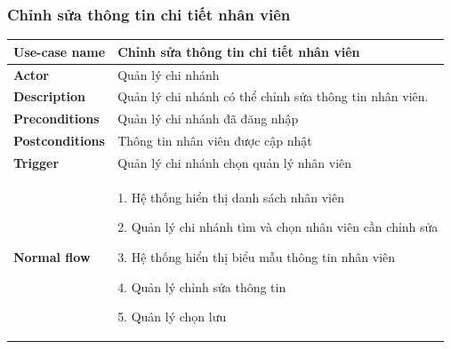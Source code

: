         \subsubsection{Chỉnh sửa thông tin chi tiết nhân viên}
        {
\setlength\extrarowheight{6pt}
            \begin{longtable}{| p{} | p{} |} 
                \hline
                    \textbf{Use-case name} 
                & 
                    Chỉnh sửa thông tin chi tiết nhân viên
                \\
                \hline
                    \textbf{Actor} 
                & 
                    Quản lý chi nhánh
                \\
                \hline
                    \textbf{Description} 
                & 
                    Quản lý chi nhánh có thể chỉnh sửa thông tin nhân viên.
                \\
                \hline
                    \textbf{Preconditions} 
                &
                    Quản lý chi nhánh đã đăng nhập
                \\
                \hline
                    \textbf{Postconditions} 
                & 
                    Thông tin nhân viên được cập nhật
                \\
                \hline
                    \textbf{Trigger} 
                & 
                    Quản lý chi nhánh chọn quản lý nhân viên
                \\
                \hline
                \begin{flushleft}
                    \textbf{Normal flow}
                \end{flushleft}
                & 
                1. Hệ thống hiển thị danh sách  nhân viên
                    
                    2. Quản lý chi nhánh tìm và chọn nhân viên cần chỉnh sửa
                    
                    3. Hệ thống hiển thị biểu mẫu thông tin nhân viên
                    
                    4. Quản lý chỉnh sửa thông tin
                    
                    5. Quản lý chọn lưu
                    

\end{longtable}}
